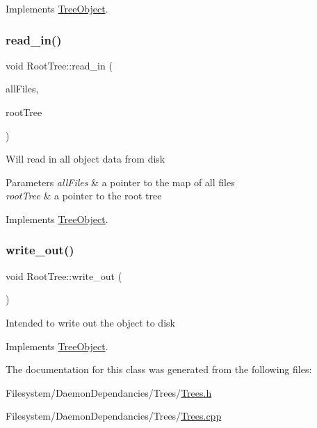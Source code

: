 Implements \mbox{\hyperlink{class_tree_object_af390b7479aa972888e594c07a85740b6}{Tree\+Object}}.

\mbox{\label{class_root_tree_a658eed78be67e890de2283af960dc532}} 
\subsubsection{\texorpdfstring{read\+\_\+in()}{read\_in()}}
{\footnotesize\ttfamily void Root\+Tree\+::read\+\_\+in (\begin{DoxyParamCaption}\item[{unordered\+\_\+multimap$<$ string, \mbox{\hyperlink{class_file_info}{File\+Info}} $\ast$$>$ $\ast$}]{all\+Files,  }\item[{\mbox{\hyperlink{class_root_tree}{Root\+Tree}} $\ast$}]{root\+Tree }\end{DoxyParamCaption})\hspace{0.3cm}{\ttfamily [virtual]}}

Will read in all object data from disk 
\begin{DoxyParams}{Parameters}
{\em all\+Files} & a pointer to the map of all files \\
\hline
{\em root\+Tree} & a pointer to the root tree \\
\hline
\end{DoxyParams}


Implements \mbox{\hyperlink{class_tree_object_a722eb00e6782626281afc8eff92840a4}{Tree\+Object}}.

\mbox{\label{class_root_tree_ad6eefe5d46ee37b3725799897a78c2dd}} 
\subsubsection{\texorpdfstring{write\+\_\+out()}{write\_out()}}
{\footnotesize\ttfamily void Root\+Tree\+::write\+\_\+out (\begin{DoxyParamCaption}{ }\end{DoxyParamCaption})\hspace{0.3cm}{\ttfamily [virtual]}}

Intended to write out the object to disk 

Implements \mbox{\hyperlink{class_tree_object_a63708d61353d83e3e03597394bb7aca0}{Tree\+Object}}.



The documentation for this class was generated from the following files\+:\begin{DoxyCompactItemize}
\item 
Filesystem/\+Daemon\+Dependancies/\+Trees/\mbox{\hyperlink{_trees_8h}{Trees.\+h}}\item 
Filesystem/\+Daemon\+Dependancies/\+Trees/\mbox{\hyperlink{_trees_8cpp}{Trees.\+cpp}}\end{DoxyCompactItemize}
